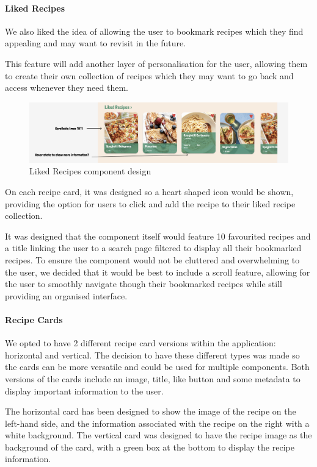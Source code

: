 \documentclass{article}
\begin{document}
\paragraph{Liked Recipes}
We also liked the idea of allowing the user to bookmark recipes which they find appealing and may want to revisit in the future. 

This feature will add another layer of personalisation for the user, allowing them to create their own collection of recipes which they may want to go back and access whenever they need them. 

\begin{figure}[h]
  \includegraphics[width=1.0\textwidth]{assets/design-images/Version 1 Liked Recipes.png}
  \centering
  \caption{Liked Recipes component design}
\end{figure}


On each recipe card, it was designed so a heart shaped icon would be shown, providing the option for users to click and add the recipe to their liked recipe collection. 

It was designed that the component itself would feature 10 favourited recipes and a title linking the user to a search page filtered to display all their bookmarked recipes. To ensure the component would not be cluttered and overwhelming to the user, we decided that it would be best to include a scroll feature, allowing for the user to smoothly navigate though their bookmarked recipes while still providing an organised interface. 

\paragraph{Recipe Cards}
We opted to have 2 different recipe card versions within the application: horizontal and vertical. The decision to have these different types was made so the cards can be more versatile and could be used for multiple components. Both versions of the cards include an image, title, like button and some metadata to display important information to the user. 

The horizontal card has been designed to show the image of the recipe on the left-hand side, and the information associated with the recipe on the right with a white background. The vertical card was designed to have the recipe image as the background of the card, with a green box at the bottom to display the recipe information.
\end{document}
